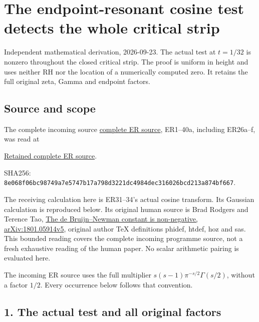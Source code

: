 \documentclass[
  10pt,
  a4paper,
]{article}
\author{}
\date{}
\begin{document}
{
\setcounter{tocdepth}{3}
\tableofcontents
}
\section{The endpoint-resonant cosine test detects the whole critical
strip}\label{the-endpoint-resonant-cosine-test-detects-the-whole-critical-strip}

Independent mathematical derivation, 2026-09-23. The actual test at
\(t=1/32\) is nonzero throughout the closed critical strip. The proof is
uniform in height and uses neither RH nor the location of a numerically
computed zero. It retains the full original zeta, Gamma and endpoint
factors.

\subsection{Source and scope}\label{source-and-scope}

The complete incoming source
\href{supporting_proofs/endpoint_resonance_20260923/ENDPOINT_RESONANCE_AND_PRIME_CLASS.tex}{complete
ER source}, ER1--40a, including ER26a--f, was read at

\href{supporting_proofs/endpoint_resonance_20260923/ENDPOINT_RESONANCE_AND_PRIME_CLASS.tex}{Retained
complete ER source}.

SHA256:
\texttt{8e068f06\allowbreak{}bc98749a\allowbreak{}7e5747b1\allowbreak{}7a798d32\allowbreak{}21dc4984\allowbreak{}dec31602\allowbreak{}6bcd213a\allowbreak{}874bf667}.

The receiving calculation here is ER31--34's actual cosine transform.
Its Gaussian calculation is reproduced below. Its original human source
is Brad Rodgers and Terence Tao,
\href{https://arxiv.org/abs/1801.05914v5}{The de Bruijn--Newman constant
is non-negative, arXiv:1801.05914v5}, original author TeX definitions
phidef, htdef, hoz and sas. This bounded reading covers the complete
incoming programme source, not a fresh exhaustive reading of the human
paper. No scalar arithmetic pairing is evaluated here.

The incoming ER source uses the full multiplier
\(s(s-1)\pi^{-s/2}\Gamma(s/2)\), without a factor \(1/2\). Every
occurrence below follows that convention.

\subsection{1. The actual test and all original
factors}\label{the-actual-test-and-all-original-factors}
\end{document}

